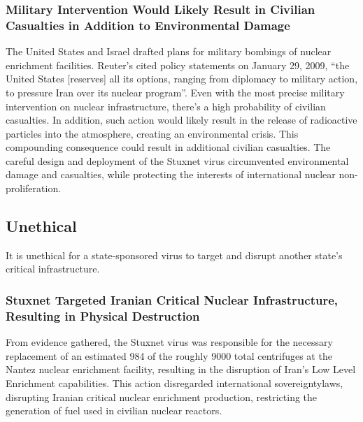 \documentclass[12pt]{article}
\begin{document}
\begin{multicols}{2}
\subsubsection{Military Intervention Would Likely Result in Civilian Casualties in Addition to Environmental Damage}

The United States and Israel drafted plans for military bombings of nuclear enrichment facilities. Reuter's cited policy statements on January 29, 2009, ``the United States [reserves] all its options, ranging from diplomacy to military action, to pressure Iran over its nuclear program''.\cite{usOptionsForIran} Even with the most precise military intervention on nuclear infrastructure, there's a high probability of civilian casualties. In addition, such action would likely result in the release of radioactive particles into the atmosphere, creating an environmental crisis. This compounding consequence could result in additional civilian casualties. The careful design and deployment of the Stuxnet virus circumvented environmental damage and casualties, while protecting the interests of international nuclear non-proliferation.

\subsection{Unethical}

It is unethical for a state-sponsored virus to target and disrupt another state's critical infrastructure.

\subsubsection{Stuxnet Targeted Iranian Critical Nuclear Infrastructure, Resulting in Physical Destruction}

From evidence gathered, the Stuxnet virus was responsible for the necessary replacement of an estimated 984 of the roughly 9000 total centrifuges at the Nantez nuclear enrichment facility, resulting in the disruption of Iran's Low Level Enrichment capabilities.\cite{lookIntoIranianNuclearProgram} This action disregarded international sovereignty\footnotemark[2]  laws, disrupting Iranian critical nuclear enrichment production, restricting the generation of fuel used in civilian nuclear reactors.\cite{internationalSovereigntyDefinition}



\end{multicols}
\end{document}

